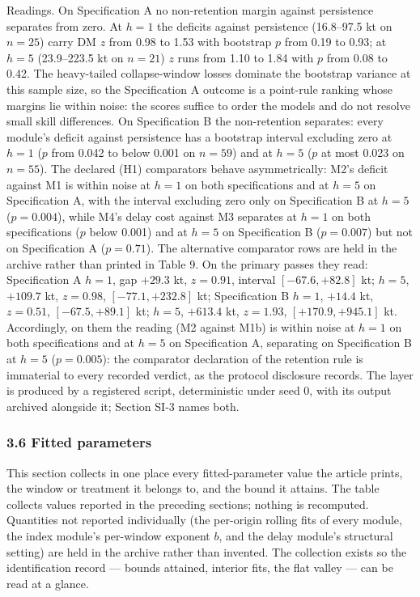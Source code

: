 \documentclass[11pt]{article}
\begin{document}
Readings. On Specification A no non-retention margin against persistence separates
from zero. At \(h=1\) the deficits against persistence (16.8--97.5 kt
on \(n=25\)) carry DM \(z\) from 0.98 to 1.53 with bootstrap \(p\) from
0.19 to 0.93; at \(h=5\) (23.9--223.5 kt on \(n=21\)) \(z\) runs from
1.10 to 1.84 with \(p\) from 0.08 to 0.42. The heavy-tailed
collapse-window losses dominate the bootstrap variance at this sample
size, so the Specification A outcome is a point-rule ranking whose
margins lie within noise: the scores suffice to order the models and do
not resolve small skill differences. On Specification B the non-retention
separates: every module's deficit against persistence has a bootstrap interval excluding zero at
\(h=1\) (\(p\) from 0.042 to below 0.001 on \(n=59\)) and at \(h=5\)
(\(p\) at most 0.023 on \(n=55\)). The declared (H1) comparators behave
asymmetrically: M2's deficit against M1 is within noise at \(h=1\) on
both specifications and at \(h=5\) on Specification A, with the interval excluding zero only
on Specification B at \(h=5\) (\(p=0.004\)), while M4's delay cost
against M3 separates at \(h=1\) on both specifications (\(p\) below
0.001) and at \(h=5\) on Specification B (\(p=0.007\)) but not on
Specification A (\(p=0.71\)). The alternative comparator rows are held in the archive rather than
printed in Table 9. On the primary passes they read: Specification A
\(h=1\), gap \(+29.3\) kt, \(z=0.91\), interval
\([-67.6, +82.8]\) kt; \(h=5\), \(+109.7\) kt, \(z=0.98\),
\([-77.1, +232.8]\) kt; Specification B \(h=1\), \(+14.4\) kt,
\(z=0.51\), \([-67.5, +89.1]\) kt; \(h=5\), \(+613.4\) kt,
\(z=1.93\), \([+170.9, +945.1]\) kt. Accordingly, on them the reading (M2
against M1b) is within noise at \(h=1\) on both specifications and at
\(h=5\) on Specification A, separating on Specification B at \(h=5\)
(\(p=0.005\)): the comparator declaration of the retention rule is
immaterial to every recorded verdict, as the protocol disclosure
records. The layer is produced by a registered script, deterministic under seed 0,
with its output archived alongside it; Section SI-3 names both.

\subsubsection{3.6 Fitted parameters}\label{fitted-parameters}

This section collects in one place every fitted-parameter value the
article prints, the window or treatment it belongs to, and the bound it
attains. The table collects values reported in the preceding
sections; nothing is recomputed. Quantities not reported individually
(the per-origin rolling fits of every module, the index module's
per-window exponent \(b\), and the delay module's structural setting)
are held in the archive rather than
invented. The collection exists so the identification record --- bounds
attained, interior fits, the flat valley --- can be read at a glance.
\end{document}
